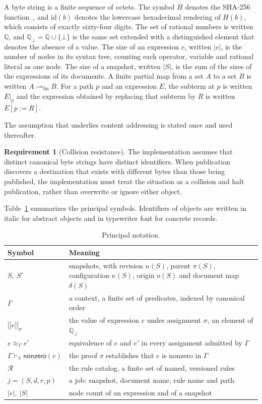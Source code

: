 \documentclass[11pt,a4paper]{article}
\theoremstyle{plain}
\theoremstyle{definition}
\newtheorem{requirement}[theorem]{Requirement}
\theoremstyle{remark}
\theoremstyle{definition}
\newcommand{\Q}{\mathbb{Q}}
\newcommand{\Qb}{\mathbb{Q}_{\bot}}
\newcommand{\nodef}{\bot}
\newcommand{\den}[2]{\mathopen{[\![}#1\mathclose{]\!]}_{#2}}
\newcommand{\eqv}[1]{\approx_{#1}}
\newcommand{\nz}{\mathsf{nonzero}}
\newcommand{\sz}[1]{\lvert #1\rvert}
\newcommand{\hid}{\mathrm{id}}
\newcommand{\Rul}{\mathcal{R}}
\newcommand{\proves}{\vdash}
\newcommand{\replace}[3]{#1[#2 \mathbin{:=} #3]}
\begin{document}
A byte string is a finite sequence of octets. The symbol $H$ denotes the SHA-256 function~\cite{fips180}, and $\hid(b)$ denotes the lowercase hexadecimal rendering of $H(b)$, which consists of exactly sixty-four digits. The set of rational numbers is written $\Q$, and $\Qb = \Q \cup \{\nodef\}$ is the same set extended with a distinguished element that denotes the absence of a value. The size of an expression $e$, written $\sz{e}$, is the number of nodes in its syntax tree, counting each operator, variable and rational literal as one node. The size of a snapshot, written $\sz{S}$, is the sum of the sizes of the expressions of its documents. A finite partial map from a set $A$ to a set $B$ is written $A \rightharpoonup_{\mathrm{fin}} B$. For a path $p$ and an expression $E$, the subterm at $p$ is written $E|_p$ and the expression obtained by replacing that subterm by $R$ is written $\replace{E}{p}{R}$.

The assumption that underlies content addressing is stated once and used thereafter.

\begin{requirement}[Collision resistance]
\label{req:collision}
The implementation assumes that distinct canonical byte strings have distinct identifiers. When publication discovers a destination that exists with different bytes than those being published, the implementation must treat the situation as a collision and halt publication, rather than overwrite or ignore either object.
\end{requirement}

Table~\ref{tab:notation} summarizes the principal symbols. Identifiers of objects are written in italic for abstract objects and in typewriter font for concrete records.

\begin{table}[t]
\centering\small
\begin{tabular}{@{}lp{9.6cm}@{}}
\toprule
Symbol & Meaning \\
\midrule
$S,\ S'$ & snapshots, with revision $n(S)$, parent $\pi(S)$, configuration $\kappa(S)$, origin $o(S)$ and document map $\delta(S)$ \\
$\Gamma$ & a context, a finite set of predicates, indexed by canonical order \\
$\den{e}{\sigma}$ & the value of expression $e$ under assignment $\sigma$, an element of $\Qb$ \\
$e \eqv{\Gamma} e'$ & equivalence of $e$ and $e'$ in every assignment admitted by $\Gamma$ \\
$\Gamma \proves_\pi \nz(e)$ & the proof $\pi$ establishes that $e$ is nonzero in $\Gamma$ \\
$\Rul$ & the rule catalog, a finite set of named, versioned rules \\
$j = (S,d,r,p)$ & a job: snapshot, document name, rule name and path \\
$\sz{e},\ \sz{S}$ & node count of an expression and of a snapshot \\
\bottomrule
\end{tabular}
\caption{Principal notation.}
\label{tab:notation}
\end{table}
\end{document}
